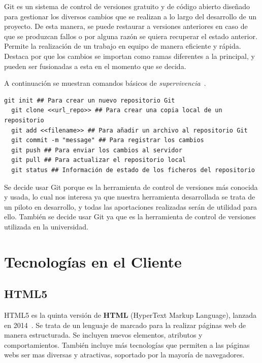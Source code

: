 \documentclass[a4paper, 12pt]{book}
\begin{document}
Git es un sistema de control de versiones gratuito y de código abierto diseñado para gestionar los diversos cambios que se realizan a lo largo del desarrollo de un proyecto. De esta manera, se puede restaurar a versiones anteriores en caso de que se produzcan fallos o por alguna razón se quiera recuperar el estado anterior.
Permite la realización de un trabajo en equipo de manera eficiente y rápida. Destaca por que los cambios se importan como ramas diferentes a la principal, y pueden ser fusionadas a esta en el momento que se decida.

A continuación se muestran comandos básicos de \textit{supervivencia}~\cite{sanchez2016git}.

\begin{lstlisting}[breaklines=true, basicstyle=\small]
  git init ## Para crear un nuevo repositorio Git
  git clone <<url_repo>> ## Para crear una copia local de un repositorio
  git add <<filename>> ## Para añadir un archivo al repositorio Git
  git commit -m "message" ## Para registrar los cambios
  git push ## Para enviar los cambios al servidor
  git pull ## Para actualizar el repositorio local
  git status ## Información de estado de los ficheros del repositorio
\end{lstlisting}

Se decide usar Git porque es la herramienta de control de versiones más conocida y usada, lo cual nos interesa ya que nuestra herramienta desarrollada se trata de un piloto en desarrollo, y todas las aportaciones realizadas serán de utilidad para ello. También se decide usar Git ya que es la herramienta de control de versiones utilizada en la universidad.

\section{Tecnologías en el Cliente}
\label{sec:seccion3}

\subsection{HTML5}
\label{subsec:html5}

HTML5 es la quinta versión de \textbf{HTML} (HyperText Markup Language), lanzada en 2014~\cite{pilgrim2010html5,gauchat2012gran}. Se trata de un lenguaje de marcado para la realizar páginas web de manera
estructurada. Se incluyen nuevos elementos, atributos y comportamientos. También incluye más tecnologías
que permiten a las páginas webs ser mas diversas y atractivas, soportado por la mayoría de navegadores.
\end{document}
